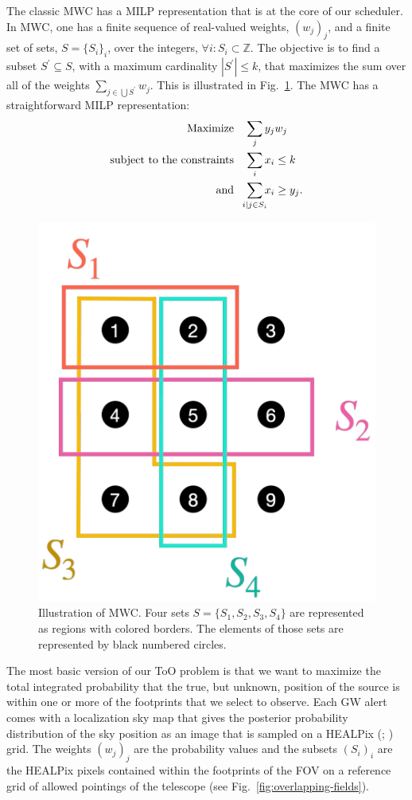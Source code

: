 \documentclass[twocolumn,times]{aastex631}
\begin{document}
The classic \ac{MWC} has a \ac{MILP} representation that is at the core of our scheduler. In \ac{MWC}, one has a finite sequence of real-valued weights, $(w_j)_j$, and a finite set of sets, $S = \{S_i\}_i$, over the integers, $\forall i: S_i \subset \mathbb{Z}$. The objective is to find a subset $S^\prime \subseteq S$, with a maximum cardinality $|S^\prime| \leq k$, that maximizes the sum over all of the weights $\sum_{j \in \bigcup S^\prime} w_j$. This is illustrated in Fig.~\ref{fig:max-weighted-coverage}. The \ac{MWC} has a straightforward \ac{MILP} representation:
%
\begin{align*}
\text{Maximize}\quad &\sum_j y_j w_j \\
\text{subject to the constraints}\quad &\sum_i x_i \leq k \\
\text{and}\quad &\sum_{\mathclap{i \mid j \in S_i}} x_i \geq y_j.
\end{align*}

\begin{figure}
    \centering
    \includegraphics[width=0.6\columnwidth]{figures/max-weighted-coverage}
    \caption{\label{fig:max-weighted-coverage}Illustration of \ac{MWC}. Four sets $S = \{S_1, S_2, S_3, S_4\}$ are represented as regions with colored borders. The elements of those sets are represented by black numbered circles.}
\end{figure}

The most basic version of our \ac{ToO} problem is that we want to maximize the total integrated probability that the true, but unknown, position of the source is within one or more of the footprints that we select to observe. Each \ac{GW} alert comes with a localization sky map that gives the posterior probability distribution of the sky position as an image that is sampled on a \acl{HEALPix} (; \citealt{2005ApJ...622..759G}) grid. The weights $(w_j)_j$ are the probability values and the subsets $(S_i)_i$ are the \ac{HEALPix} pixels contained within the footprints of the \ac{FOV} on a reference grid of allowed pointings of the telescope (see Fig.~\ref{fig:overlapping-fields}).
\end{document}
